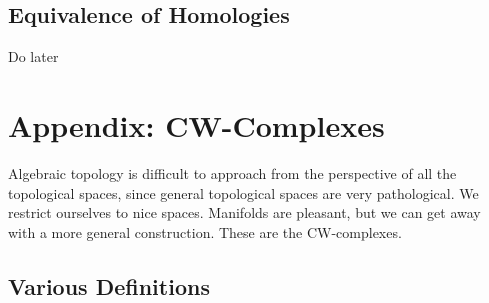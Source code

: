 \section{Equivalence of Homologies}

Do later






\chapter{Appendix: CW-Complexes}

Algebraic topology is difficult to approach from the perspective of all the topological spaces, since general topological spaces are very pathological. We restrict ourselves to nice spaces. Manifolds are pleasant, but we can get away with a more general construction. These are the CW-complexes.

\section{Various Definitions}

